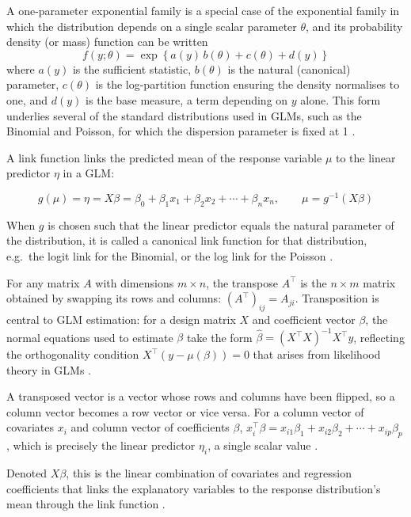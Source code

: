\begin{defbox}
A one-parameter exponential family is a special case of the exponential family in which the distribution depends on a single scalar parameter $\theta$, and its probability density (or mass) function can be written
\[
f(y;\theta) = \exp\left\{a(y)\,b(\theta) + c(\theta) + d(y)\right\}
\]
where $a(y)$ is the sufficient statistic, $b(\theta)$ is the natural (canonical) parameter, $c(\theta)$ is the log-partition function ensuring the density normalises to one, and $d(y)$ is the base measure, a term depending on $y$ alone. This form underlies several of the standard distributions used in GLMs, such as the Binomial and Poisson, for which the dispersion parameter is fixed at 1 \citep{taylor_nd}.
\end{defbox}

A link function links the predicted mean of the response variable $\mu$ to the linear predictor $\eta$ in a GLM:
\begin{mathbox}
\[
g(\mu) = \eta = X\beta = \beta_0+\beta_1 x_1+\beta_2 x_2+\cdots+\beta_n x_n, \qquad \mu = g^{-1}(X\beta)
\]
\end{mathbox}
When $g$ is chosen such that the linear predictor equals the natural parameter of the distribution, it is called a canonical link function for that distribution, e.g.\ the logit link for the Binomial, or the log link for the Poisson \citep{dobson2018}.

For any matrix $A$ with dimensions $m\times n$, the transpose $A^\top$ is the $n\times m$ matrix obtained by swapping its rows and columns: $(A^\top)_{ij} = A_{ji}$. Transposition is central to GLM estimation: for a design matrix $X$ and coefficient vector $\beta$, the normal equations used to estimate $\beta$ take the form $\hat\beta = (X^\top X)^{-1}X^\top y$, reflecting the orthogonality condition $X^\top(y-\mu(\beta))=0$ that arises from likelihood theory in GLMs \citep{casella2002}.

A transposed vector is a vector whose rows and columns have been flipped, so a column vector becomes a row vector or vice versa. For a column vector of covariates $x_i$ and column vector of coefficients $\beta$, $x_i^\top\beta = x_{i1}\beta_1+x_{i2}\beta_2+\cdots+x_{ip}\beta_p$, which is precisely the linear predictor $\eta_i$, a single scalar value \citep{casella2002}.

Denoted $X\beta$, this is the linear combination of covariates and regression coefficients that links the explanatory variables to the response distribution's mean through the link function \citep{dobson2018}.

